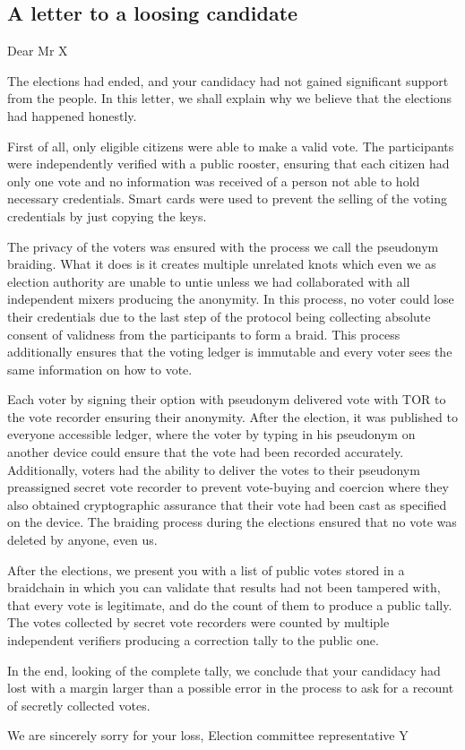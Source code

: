 \documentclass[12pt,a4paper]{article}
\let\Oldsubsection\subsection
\renewcommand{\subsection}{\FloatBarrier\Oldsubsection}
\begin{document}
\subsection{A letter to a loosing candidate}
Dear Mr X\par
The elections had ended, and your candidacy had not gained significant support from the people. In this letter, we shall explain why we believe that the elections had happened honestly.\par
First of all, only eligible citizens were able to make a valid vote. The participants were independently verified with a public rooster, ensuring that each citizen had only one vote and no information was received of a person not able to hold necessary credentials. Smart cards were used to prevent the selling of the voting credentials by just copying the keys.\par
The privacy of the voters was ensured with the process we call the pseudonym braiding. What it does is it creates multiple unrelated knots which even we as election authority are unable to untie unless we had collaborated with all independent mixers producing the anonymity. In this process, no voter could lose their credentials due to the last step of the protocol being collecting absolute consent of validness from the participants to form a braid. This process additionally ensures that the voting ledger is immutable and every voter sees the same information on how to vote.\par
Each voter by signing their option with pseudonym delivered vote with TOR to the vote recorder ensuring their anonymity. After the election, it was published to everyone accessible ledger, where the voter by typing in his pseudonym on another device could ensure that the vote had been recorded accurately. Additionally, voters had the ability to deliver the votes to their pseudonym preassigned secret vote recorder to prevent vote-buying and coercion where they also obtained cryptographic assurance that their vote had been cast as specified on the device. The braiding process during the elections ensured that no vote was deleted by anyone, even us.\par
After the elections, we present you with a list of public votes stored in a braidchain in which you can validate that results had not been tampered with, that every vote is legitimate, and do the count of them to produce a public tally. The votes collected by secret vote recorders were counted by multiple independent verifiers producing a correction tally to the public one.\par
In the end, looking of the complete tally, we conclude that your candidacy had lost with a margin larger than a possible error in the process to ask for a recount of secretly collected votes.\par
We are sincerely sorry for your loss,
Election committee representative Y\par
\end{document}
